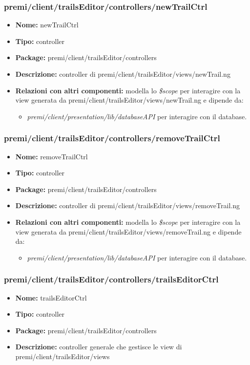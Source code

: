 \subsubsection{premi/client/trailsEditor/controllers/newTrailCtrl}
\begin{itemize}
  \item[] \textbf{Nome:} newTrailCtrl
  \item[] \textbf{Tipo:} controller
  \item[] \textbf{Package:} premi/client/trailsEditor/controllers
  \item[] \textbf{Descrizione:} controller di premi/client/trailsEditor/views/newTrail.ng
  \item[] \textbf{Relazioni con altri componenti:} modella lo \textit{\$scope} per interagire con la view generata da premi/client/trailsEditor/views/newTrail.ng e dipende da:
  \begin{itemize}
  	\item \textit{premi/client/presentation/lib/databaseAPI} per interagire con il database.
  \end{itemize}
\end{itemize}
\subsubsection{premi/client/trailsEditor/controllers/removeTrailCtrl}
\begin{itemize}
  \item[] \textbf{Nome:} removeTrailCtrl
  \item[] \textbf{Tipo:} controller
  \item[] \textbf{Package:} premi/client/trailsEditor/controllers
  \item[] \textbf{Descrizione:} controller di premi/client/trailsEditor/views/removeTrail.ng
  \item[] \textbf{Relazioni con altri componenti:} modella lo \textit{\$scope} per interagire con la view generata da premi/client/trailsEditor/views/removeTrail.ng e dipende da:
  \begin{itemize}
  	\item \textit{premi/client/presentation/lib/databaseAPI} per interagire con il database.
  \end{itemize}
\end{itemize}
\subsubsection{premi/client/trailsEditor/controllers/trailsEditorCtrl}
\begin{itemize}
  \item[] \textbf{Nome:} trailsEditorCtrl
  \item[] \textbf{Tipo:} controller
  \item[] \textbf{Package:} premi/client/trailsEditor/controllers
  \item[] \textbf{Descrizione:} controller generale che gestisce le view di premi/client/trailsEditor/views
\end{itemize}
